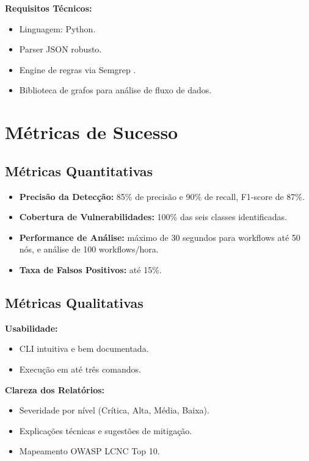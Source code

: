 \documentclass{sftex}
\begin{document}
\textbf{Requisitos Técnicos:}
\begin{itemize}
  \item Linguagem: Python.
  \item Parser JSON robusto.
  \item Engine de regras via Semgrep \cite{semgrep_platform}.
  \item Biblioteca de grafos para análise de fluxo de dados.
\end{itemize}

\newpage
\section{Métricas de Sucesso}

\subsection{Métricas Quantitativas}

\begin{itemize}
  \item \textbf{Precisão da Detecção:} 85\% de precisão e 90\% de recall, F1-score de 87\%.
  \item \textbf{Cobertura de Vulnerabilidades:} 100\% das seis classes identificadas.
  \item \textbf{Performance de Análise:} máximo de 30 segundos para workflows até 50 nós, e análise de 100 workflows/hora.
  \item \textbf{Taxa de Falsos Positivos:} até 15\%.
\end{itemize}

\subsection{Métricas Qualitativas}

\textbf{Usabilidade:}
\begin{itemize}
  \item CLI intuitiva e bem documentada.
  \item Execução em até três comandos.
\end{itemize}

\textbf{Clareza dos Relatórios:}
\begin{itemize}
  \item Severidade por nível (Crítica, Alta, Média, Baixa).
  \item Explicações técnicas e sugestões de mitigação.
  \item Mapeamento OWASP LCNC Top 10.
\end{itemize}
\end{document}
